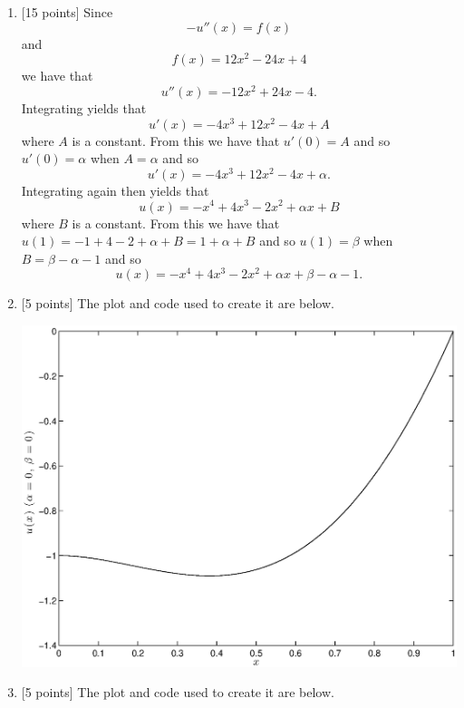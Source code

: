 \begin{solution}
\begin{enumerate}
\item {[15 points]} Since
\[
-u''(x)=f(x)
\]
and
\[
f(x)=12x^2-24x+4
\]
we have that
\[
u''(x)=-12 x^2+24x-4.
\]
Integrating yields that
\[
u'(x)=-4x^3+12x^2-4x+A
\]
where $A$ is a constant. From this we have that $u'(0)=A$ and so $u'(0)=\alpha$ when $A=\alpha$ and so
\[
u'(x)=-4x^3+12x^2-4x+\alpha.
\]
Integrating again then yields that
\[
u(x)=-x^4+4x^3-2x^2+\alpha x+B
\]
where $B$ is a constant. From this we have that $u(1)=-1+4-2+\alpha+B=1+\alpha+B$ and so $u(1)=\beta$ when $B=\beta-\alpha-1$ and so
\[
u(x)=-x^4+4x^3-2x^2+\alpha x+\beta-\alpha-1.
\]

\vspace*{1em}
\item {[5 points]} The plot and code used to create it are below.

\begin{center}
\includegraphics[scale=0.7]{hw5b.eps}
\end{center}



\vspace*{1em}
\item {[5 points]} The plot and code used to create it are below.


\end{enumerate}
\end{solution}
